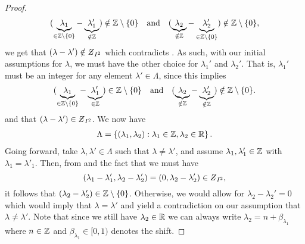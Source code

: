 \documentclass[../thesis.tex]{subfiles}
\begin{document}
\begin{proof}
\begin{align*}
        (\underbrace{\lambda_1}_{\in \mathbb{Z}\setminus\{0\}}-\underbrace{\lambda_1'}_{\notin \mathbb{Z}}) \notin \mathbb{Z}\setminus\{0\}
        \quad \text{and} \quad
        (\underbrace{\lambda_2}_{\notin \mathbb{Z}}-\underbrace{\lambda_2'}_{\in \mathbb{Z}\setminus\{0\}}) \notin \mathbb{Z}\setminus\{0\},
    \end{align*}
    we get that $\brac{\lambda-\lambda'} \notin \Zstroke_{I^2}$ which contradicts . As such, with our initial assumptions for $\lambda$, we must have the other choice for $\lambda_1'$ and $\lambda_2'$. That is, $\lambda_1'$ must be an integer for any element $\lambda'\in \Lambda$, since this implies
    \begin{align*} %
        \brac{\underbrace{\lambda_1}_{\in \intnozero}-\underbrace{\lambda_1'}_{\in \Z}} \in \intnozero
        \quad \text{and} \quad
        \brac{\underbrace{\lambda_2}_{\notin \Z}-\underbrace{\lambda_2'}_{\notin \Z}} \notin \intnozero.
    \end{align*}
    and that $\brac{\lambda-\lambda'} \in \Zstroke_{I^2}$. 
    We now have %
    \begin{align*}
        \Lambda = \left\{ \left(\lambda_1, \lambda_2\right) : \lambda_1 \in \mathbb{Z}, \lambda_2 \in \mathbb{R}\right\}.
    \end{align*}
    Going forward, take $\lambda, \lambda' \in \Lambda$ such that $\lambda\neq \lambda'$, and assume $\lambda_1,\lambda'_1 \in \mathbb{Z}$ with $\lambda_1 = \lambda'_1$. Then, from  and the fact that we must have 
    \begin{equation*}
        \brac{\lambda_1-\lambda'_1,\lambda_2-\lambda'_2} = \brac{0,\lambda_2-\lambda'_2}\in \Zstroke_{I^2},
    \end{equation*}
    it follows that $(\lambda_2- \lambda_2') \in \mathbb{Z}\setminus\{0\}$. Otherwise, we would allow for $\lambda_2-\lambda_2'=0$ which would imply that $\lambda=\lambda'$ and yield a contradiction on our assumption that $\lambda\neq\lambda'$. Note that since we still have $\lambda_2\in \mathbb{R}$ we can always write $\lambda_2 = n+\beta_{\lambda_1}$ where $n\in \mathbb{Z}$ and $\beta_{\lambda_1}\in [0,1)$ denotes the shift.

\end{proof}
\end{document}
